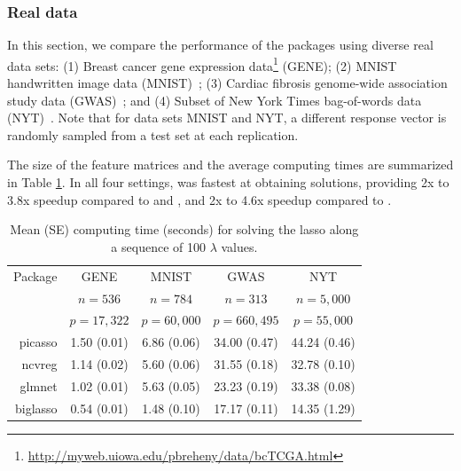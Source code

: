 \subsubsection{Real data}


In this section, we compare the performance of the packages using diverse real data sets: (1) Breast cancer gene expression data\footnote{\url{http://myweb.uiowa.edu/pbreheny/data/bcTCGA.html}} (GENE); (2) MNIST handwritten image data (MNIST)~\citep{lecun1998gradient}; (3) Cardiac fibrosis genome-wide association study data (GWAS)~\citep{breheny2016marginal}; and (4) Subset of New York Times bag-of-words data (NYT)~\citep{Dua:2017}. Note that for data sets MNIST and NYT, a different response vector is randomly sampled from a test set at each replication.


The size of the feature matrices and the average computing times are summarized in Table \ref{tab_real_res}. In all four settings,  was fastest at obtaining solutions, providing 2x to 3.8x speedup compared to  and , and 2x to 4.6x speedup compared to .

\begin{table}[htbp]
\centering
\begin{tabular}{r|cccc}
\toprule
Package & GENE & MNIST & GWAS & NYT \\
 & $n=536$ & $n=784$ & $n=313$ & $n=5,000$ \\
 & $p=17,322$ & $p=60,000$ & $p=660,495$ & $p=55,000$ \\
\midrule
picasso & 1.50 (0.01) & 6.86 (0.06) & 34.00 (0.47) & 44.24 (0.46) \\
ncvreg & 1.14 (0.02) & 5.60 (0.06) & 31.55 (0.18) & 32.78 (0.10) \\
glmnet & 1.02 (0.01) & 5.63 (0.05) & 23.23 (0.19) & 33.38 (0.08) \\
biglasso & 0.54 (0.01) & 1.48 (0.10) & 17.17 (0.11) & 14.35 (1.29) \\
\bottomrule
\end{tabular}
\caption{Mean (SE) computing time (seconds) for solving the lasso along a sequence of 100 $\lambda$ values.}
\label{tab_real_res}
\end{table}


